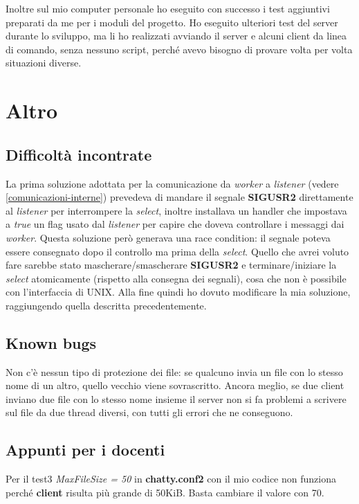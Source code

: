 \documentclass[a4paper]{article}
\theoremstyle{theorem}
\theoremstyle{remark}
\theoremstyle{definition}
\theoremstyle{corollary}
\theoremstyle{lemma}
\newcommand\file[1]{%
	\textbf{#1}}
\newcommand\codeName[1]{%
	\textit{#1}}
\begin{document}
Inoltre sul mio computer personale ho eseguito con successo i test aggiuntivi preparati da me per i moduli del progetto. Ho eseguito ulteriori test del server durante lo sviluppo, ma li ho realizzati avviando il server e alcuni client da linea di comando, senza nessuno script, perché avevo bisogno di provare volta per volta situazioni diverse.

\section{Altro}
\subsection{Difficoltà incontrate}\label{difficolta}
La prima soluzione adottata per la comunicazione da \codeName{worker} a \codeName{listener} (vedere \autoref{comunicazioni-interne}) prevedeva di mandare il segnale \textbf{SIGUSR2} direttamente al \codeName{listener} per interrompere la \codeName{select}, inoltre installava un handler che impostava a \codeName{true} un flag usato dal \codeName{listener} per capire che doveva controllare i messaggi dai \codeName{worker}. Questa soluzione però generava una race condition: il segnale poteva essere consegnato dopo il controllo ma prima della \codeName{select}. Quello che avrei voluto fare sarebbe stato mascherare/smascherare \textbf{SIGUSR2} e terminare/iniziare la \codeName{select} atomicamente (rispetto alla consegna dei segnali), cosa che non è possibile con l'interfaccia di UNIX. Alla fine quindi ho dovuto modificare la mia soluzione, raggiungendo quella descritta precedentemente.

\subsection{Known bugs}
Non c'è nessun tipo di protezione dei file: se qualcuno invia un file con lo stesso nome di un altro, quello vecchio viene sovrascritto. Ancora meglio, se due client inviano due file con lo stesso nome insieme il server non si fa problemi a scrivere sul file da due thread diversi, con tutti gli errori che ne conseguono.

\subsection{Appunti per i docenti}
Per il test3 \textit{MaxFileSize = 50} in \file{chatty.conf2} con il mio codice non funziona perché \file{client} risulta più grande di 50KiB. Basta cambiare il valore con 70.
\
\end{document}
